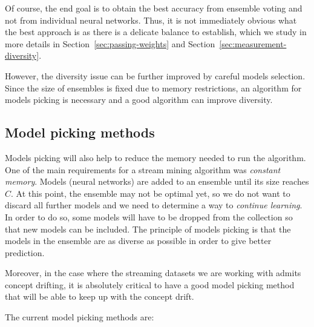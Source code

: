 \documentclass[conference]{IEEEtran}
\begin{document}
		Of course, the end goal is to obtain the best accuracy from ensemble voting and not from individual neural networks. Thus, it is not immediately obvious what the best approach is as there is a delicate balance to establish, which we study in more details in Section~\ref{sec:passing-weights} and Section~\ref{sec:measurement-diversity}.
		
		However, the diversity issue can be further improved by careful models selection. Since the size of ensembles is fixed due to memory restrictions, an algorithm for models picking is necessary and a good algorithm can improve diversity.
		
		\subsection{Model picking methods}
		\label{sec:model-picking}
				
		Models picking will also help to reduce the memory needed to run the algorithm. One of the main requirements for a stream mining algorithm was \emph{constant memory}. Models (neural networks) are added to an ensemble until its size reaches $C$. At this point, the ensemble may not be optimal yet, so we do not want to discard all further models and we need to determine a way to \emph{continue learning}. In order to do so, some models will have to be dropped from the collection so that new models can be included. The principle of models picking is that the models in the ensemble are as diverse as possible in order to give better prediction. 
		
		Moreover, in the case where the streaming datasets we are working with admits concept drifting, it is absolutely critical	to have a good model picking method that will be able to keep up with the concept drift.
		
		The current model picking methods are:
\end{document}

